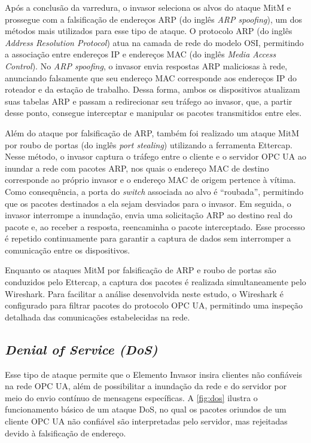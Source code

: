         Após a conclusão da varredura, o invasor seleciona os alvos do ataque MitM e prossegue com a falsificação de endereços ARP (do inglês \textit{ARP spoofing}), um dos métodos mais utilizados para esse tipo de ataque. O protocolo ARP (do inglês \textit{Address Resolution Protocol}) atua na camada de rede do modelo OSI, permitindo a associação entre endereços IP e endereços MAC (do inglês \textit{Media Access Control}). No \textit{ARP spoofing}, o invasor envia respostas ARP maliciosas à rede, anunciando falsamente que seu endereço MAC corresponde aos endereços IP do roteador e da estação de trabalho. Dessa forma, ambos os dispositivos atualizam suas tabelas ARP e passam a redirecionar seu tráfego ao invasor, que, a partir desse ponto, consegue interceptar e manipular os pacotes transmitidos entre eles.

        Além do ataque por falsificação de ARP, também foi realizado um ataque MitM por roubo de portas (do inglês \textit{port stealing}) utilizando a ferramenta Ettercap. Nesse método, o invasor captura o tráfego entre o cliente e o servidor OPC UA ao inundar a rede com pacotes ARP, nos quais o endereço MAC de destino corresponde ao próprio invasor e o endereço MAC de origem pertence à vítima. Como consequência, a porta do \textit{switch} associada ao alvo é ``roubada'', permitindo que os pacotes destinados a ela sejam desviados para o invasor. Em seguida, o invasor interrompe a inundação, envia uma solicitação ARP ao destino real do pacote e, ao receber a resposta, reencaminha o pacote interceptado. Esse processo é repetido continuamente para garantir a captura de dados sem interromper a comunicação entre os dispositivos.

        Enquanto os ataques MitM por falsificação de ARP e roubo de portas são conduzidos pelo Ettercap, a captura dos pacotes é realizada simultaneamente pelo Wireshark. Para facilitar a análise desenvolvida neste estudo, o Wireshark é configurado para filtrar pacotes do protocolo OPC UA, permitindo uma inspeção detalhada das comunicações estabelecidas na rede.

    \subsection{\textit{Denial of Service (DoS)}}

        Esse tipo de ataque permite que o Elemento Invasor insira clientes não confiáveis na rede OPC UA, além de possibilitar a inundação da rede e do servidor por meio do envio contínuo de mensagens específicas. A \autoref{fig:dos} ilustra o funcionamento básico de um ataque DoS, no qual os pacotes oriundos de um cliente OPC UA não confiável são interpretadas pelo servidor, mas rejeitadas devido à falsificação de endereço.

